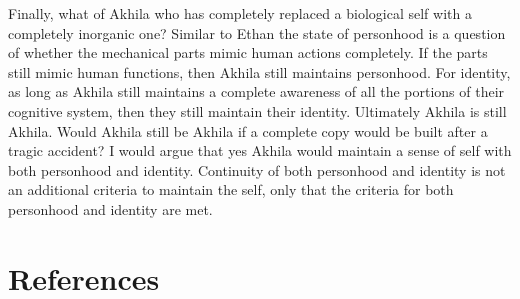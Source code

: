 \documentclass[
	letterpaper, %
]{jdf}
\begin{document}
Finally, what of Akhila who has completely replaced a biological self with a completely inorganic one? Similar to Ethan the state of personhood is a question of whether the mechanical parts mimic human actions completely. If the parts still mimic human functions, then Akhila still maintains personhood. For identity, as long as Akhila still maintains a complete awareness of all the portions of their cognitive system, then they still maintain their identity. Ultimately Akhila is still Akhila. Would Akhila still be Akhila if a complete copy would be built after a tragic accident? I would argue that yes Akhila would maintain a sense of self with both personhood and identity. Continuity of both personhood and identity is not an additional criteria to maintain the self, only that the criteria for both personhood and identity are met.


\section{References}
\printbibliography[heading=none]
\end{document}
